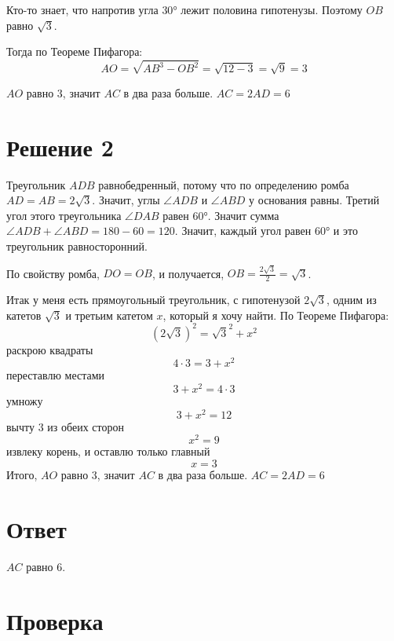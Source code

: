 \documentclass{article}
\begin{document}
Кто-то знает, что напротив угла $\ang{30}$ лежит половина гипотенузы. Поэтому $OB$ равно $\sqrt{3}$.

Тогда по Теореме Пифагора:
\[
AO=\sqrt{AB^3-OB^2}=\sqrt{12-3}=\sqrt{9}=3
\]

$AO$ равно 3, значит $AC$ в два раза больше. $AC=2AD=6$

\section{Решение 2}
Треугольник $ADB$ равнобедренный, потому что по определению ромба $AD=AB=2\sqrt{3}$. Значит, углы $\angle{}ADB$ и $\angle{}ABD$ у основания равны. Третий угол этого треугольника $\angle{}DAB$ равен $\ang{60}$. Значит сумма $\angle{}ADB+\angle{}ABD=180-60=120$. Значит, каждый угол равен $\ang{60}$ и это треугольник равносторонний.

По свойству ромба, $DO=OB$, и получается, $OB=\frac{2\sqrt{3}}{2}=\sqrt{3}$.

Итак у меня есть прямоугольный треугольник, с гипотенузой $2\sqrt{3}$, одним из катетов $\sqrt{3}$ и третьим катетом $x$, который я хочу найти. По Теореме Пифагора:
$$
(2\sqrt{3})^2=\sqrt{3}^2+x^2
$$
раскрою квадраты
$$
4\cdot{}3=3+x^2
$$
переставлю местами
$$
3+x^2=4\cdot{}3
$$
умножу
$$
3+x^2=12
$$
вычту $3$ из обеих сторон
$$
x^2=9
$$
извлеку корень, и оставлю только главный
$$
x=3
$$
Итого, $AO$ равно 3, значит $AC$ в два раза больше. $AC=2AD=6$

\section{Ответ}
$AC$ равно 6.

\section{Проверка}
\end{document}
